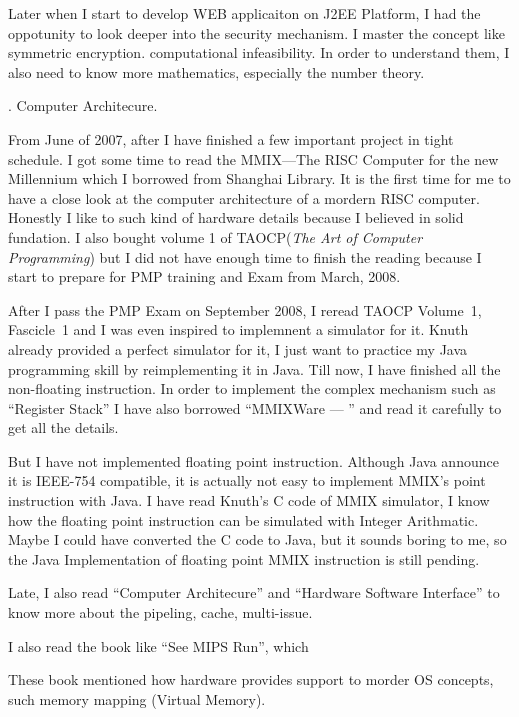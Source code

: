 Later when I start to develop WEB applicaiton on J2EE Platform, I had the 
oppotunity to look deeper into the security mechanism. I master the concept like
symmetric encryption. computational infeasibility. In order to understand them,
I also need to know more mathematics, especially the number theory.

{}. Computer Architecure.%

From June of 2007, after I have finished a few important project in tight 
schedule. I got some time to read the MMIX---The RISC Computer for the new 
Millennium which I borrowed from Shanghai Library. It is the first time for me 
to have a close look at the computer 
architecture of a mordern RISC computer. Honestly I like to such kind of 
hardware details because I believed in solid fundation. I also bought volume 1 
of TAOCP({\it The Art of Computer Programming\/}) but I did not have enough 
time to finish the reading because I start to prepare for PMP training and Exam 
from March, 2008. 

After I pass the PMP Exam on September 2008, I reread TAOCP Volume~1, Fascicle~1
and I was even inspired to implemnent a simulator for it. Knuth already provided 
a perfect simulator for it, I just want to practice my Java programming skill by
reimplementing it in Java. Till now, I have finished all the non-floating 
instruction. In order to implement the complex mechanism such as ``Register Stack''
I have also borrowed ``MMIXWare --- '' and read it carefully to get all the details.
 
But I have not implemented floating point instruction. Although Java announce 
it is IEEE-754 compatible, it is actually not easy to implement MMIX's point 
instruction with Java. I have read Knuth's C code of MMIX simulator, I know how 
the floating point instruction can be simulated with Integer Arithmatic. Maybe I 
could have converted the C code to Java, but it sounds  boring to me, so the Java
Implementation of floating point MMIX instruction is still pending. 

Late, I also read ``Computer Architecure'' and ``Hardware Software Interface'' to 
know more about the pipeling, cache, multi-issue.

I also read the book like ``See MIPS Run'', which 

These book mentioned how hardware provides support to morder OS concepts, such 
memory mapping (Virtual Memory).

